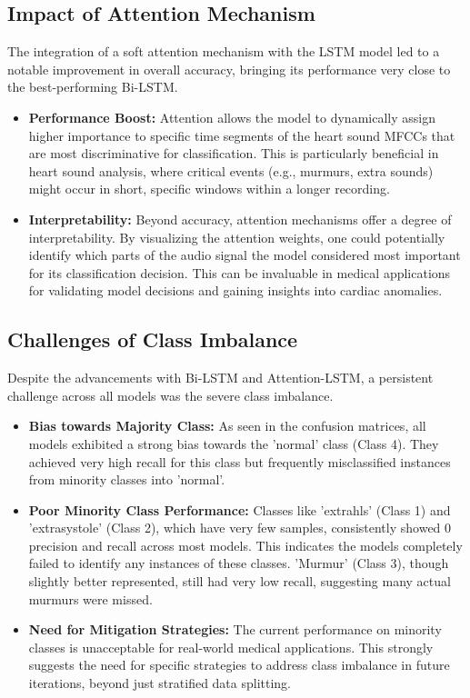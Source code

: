 \documentclass[a4paper]{article}
\begin{document}
\begin{multicols}{2}
\subsection{Impact of Attention Mechanism}
The integration of a soft attention mechanism with the LSTM model led to a notable improvement in overall accuracy, bringing its performance very close to the best-performing Bi-LSTM.
\begin{itemize}
    \item \textbf{Performance Boost:} Attention allows the model to dynamically assign higher importance to specific time segments of the heart sound MFCCs that are most discriminative for classification. This is particularly beneficial in heart sound analysis, where critical events (e.g., murmurs, extra sounds) might occur in short, specific windows within a longer recording.
    \item \textbf{Interpretability:} Beyond accuracy, attention mechanisms offer a degree of interpretability. By visualizing the attention weights, one could potentially identify which parts of the audio signal the model considered most important for its classification decision. This can be invaluable in medical applications for validating model decisions and gaining insights into cardiac anomalies.
\end{itemize}

\subsection{Challenges of Class Imbalance}
Despite the advancements with Bi-LSTM and Attention-LSTM, a persistent challenge across all models was the severe class imbalance.
\begin{itemize}
    \item \textbf{Bias towards Majority Class:} As seen in the confusion matrices, all models exhibited a strong bias towards the 'normal' class (Class 4). They achieved very high recall for this class but frequently misclassified instances from minority classes into 'normal'.
    \item \textbf{Poor Minority Class Performance:} Classes like 'extrahls' (Class 1) and 'extrasystole' (Class 2), which have very few samples, consistently showed 0 precision and recall across most models. This indicates the models completely failed to identify any instances of these classes. 'Murmur' (Class 3), though slightly better represented, still had very low recall, suggesting many actual murmurs were missed.
    \item \textbf{Need for Mitigation Strategies:} The current performance on minority classes is unacceptable for real-world medical applications. This strongly suggests the need for specific strategies to address class imbalance in future iterations, beyond just stratified data splitting.
\end{itemize}


\end{multicols}
\end{document}
